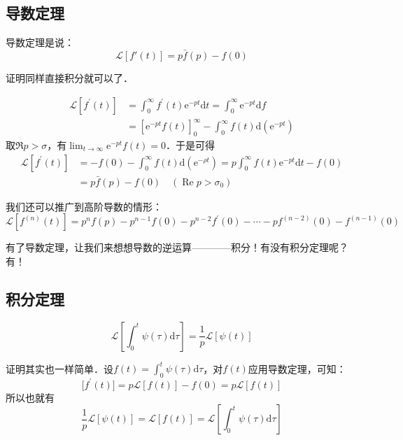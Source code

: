 \subsection{导数定理}

导数定理是说：
\begin{equation}
\mathscr L[f'(t)]=p\bar f(p)-f(0)
\end{equation}

证明同样直接积分就可以了．

\begin{equation}
\begin{aligned} \mathscr L[f^{\prime}(t)] & = \int_{0}^{\infty} f^{\prime}(t) \mathrm{e}^{-p t} \mathrm{d} t=\int_{0}^{\infty} \mathrm{e}^{-p t} \mathrm{d} f \\ &=\left[\mathrm{e}^{-p t} f(t)\right]_{0}^{\infty}-\int_{0}^{\infty} f(t) \mathrm{d}\left(\mathrm{e}^{-p t}\right) \end{aligned}
\end{equation}
取$\Re p>\sigma$，有$\lim_{t\to\infty}\mathrm{e}^{-pt}f(t)=0$．于是可得
\begin{equation}
\begin{aligned} \mathscr L[f^{\prime}(t)] & = -f(0)-\int_{0}^{\infty} f(t) \mathrm{d}\left(\mathrm{e}^{-\rho t}\right)=p \int_{0}^{\infty} f(t) \mathrm{e}^{-p t} \mathrm{d} t-f(0) \\ &=p \bar{f}(p)-f(0) \quad\left(\operatorname{Re} p>\sigma_{0}\right) \end{aligned}
\end{equation}

我们还可以推广到高阶导数的情形：
\begin{equation}
\mathscr L[f^{(n)}(t)] = p^{n} f(p)-p^{n-1} f(0)-p^{n-2} f^{\prime}(0)-\cdots-p f^{(n-2)}(0)-f^{(n-1)}(0)
\end{equation} 

有了导数定理，让我们来想想导数的逆运算————积分！有没有积分定理呢？有！

\subsection{积分定理}
\begin{equation}
\mathscr L\left[\int_{0}^{t} \psi(\tau) \mathrm{d} \tau \right]=\frac{1}{p} \mathscr{L}[\psi(t)]
\end{equation}

证明其实也一样简单．设$\displaystyle f(t)=\int_{0}^{t} \psi(\tau) \mathrm{d} \tau$，对$f(t)$应用导数定理，可知：
\begin{equation}
\mathscr[f^{\prime}(t)]=p \mathscr{L}[f(t)]-f(0)=p \mathscr{L}[f(t)]
\end{equation}
所以也就有
\begin{equation}
\frac{1}{p} \mathscr{L}[\psi(t)]=\mathscr{L}[f(t)]=\mathscr{L}\left[\int_{0}^{t} \psi(\tau) \mathrm{d} \tau\right]
\end{equation}